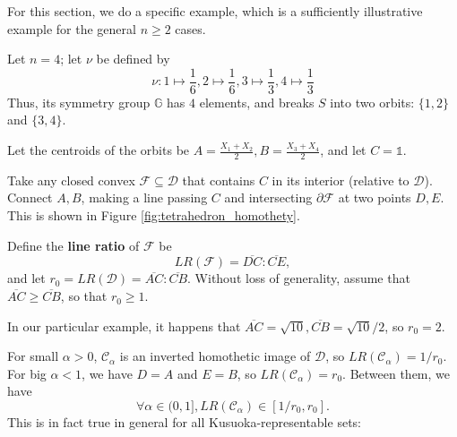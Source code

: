 For this section, we do a specific example, which is a sufficiently illustrative example for the general \(n \ge 2\) cases.

Let \(n=4\); let \(\nu \) be defined by
\[\nu: 1\mapsto \frac{1}{6}, 2\mapsto \frac{1}{6}, 3\mapsto \frac{1}{3}, 4\mapsto \frac{1}{3}\]
Thus, its symmetry group \(\mathbb{G}\) has \(4\) elements, and breaks \(S\) into two orbits: \(\{1, 2\} \) and \(\{3,4\} \). 

Let the centroids of the orbits be \(A = \frac{X_1 + X_2}{2}, B = \frac{X_3 + X_4}{2}\), and let \(C = \mathds{1}\).

Take any closed convex \(\mathscr{F} \subseteq \mathscr{D}\) that contains \(C\) in its interior (relative to \(\mathscr{D}\)). Connect \(A, B\), making a line passing \(C\) and intersecting \(\partial\mathscr{F}\) at two points $D, E$. This is shown in Figure \ref{fig:tetrahedron_homothety}.

Define the \textbf{line ratio} of \(\mathscr{F}\) be 
$$LR(\mathscr{F}) = \overline{DC} : \overline{CE},$$
and let $r_0 = LR(\mathscr{D}) = \overline{AC} : \overline{CB}$. Without loss of generality, assume that $\overline{AC} \ge \overline{CB}$, so that $r_0 \ge 1$. 

In our particular example, it happens that $\overline{AC} = \sqrt{10}, \overline{CB} = \sqrt{10}/2$, so $r_0 = 2$.

For small $\alpha > 0$, $\mathscr{C}_\alpha$ is an inverted homothetic image of $\mathscr{D}$, so $LR(\mathscr{C}_\alpha) = 1/r_0$. For big $\alpha < 1$, we have $D = A$ and $E = B$, so $LR(\mathscr{C}_\alpha) = r_0$. Between them, we have 
$$\forall \alpha\in (0, 1], LR(\mathscr{C}_\alpha)\in [1/r_0, r_0].$$
This is in fact true in general for all Kusuoka-representable sets:

